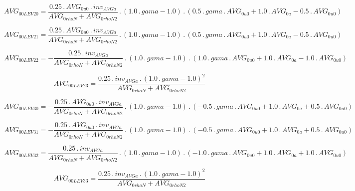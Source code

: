 \documentclass{article}
\begin{document}
\begin{dmath}AVG_{0 0 LEV 20} = \frac{0.25 \,.\, AVG_{0 u0} \,.\, inv_{AVG a}}{AVG_{0 rhoN} + AVG_{0 rhoN2}} \,.\, \left(1.0 \,.\, gama - 1.0\right) \,.\, \left(0.5 \,.\, gama \,.\, AVG_{0 u0} + 1.0 \,.\, AVG_{0 a} - 0.5 \,.\, AVG_{0 
u0}\right)\end{dmath}

\begin{dmath}AVG_{0 0 LEV 21} = \frac{0.25 \,.\, AVG_{0 u0} \,.\, inv_{AVG a}}{AVG_{0 rhoN} + AVG_{0 rhoN2}} \,.\, \left(1.0 \,.\, gama - 1.0\right) \,.\, \left(0.5 \,.\, gama \,.\, AVG_{0 u0} + 1.0 \,.\, AVG_{0 a} - 0.5 \,.\, AVG_{0 
u0}\right)\end{dmath}

\begin{dmath}AVG_{0 0 LEV 22} = - \frac{0.25 \,.\, inv_{AVG a}}{AVG_{0 rhoN} + AVG_{0 rhoN2}} \,.\, \left(1.0 \,.\, gama - 1.0\right) \,.\, \left(1.0 \,.\, gama \,.\, AVG_{0 u0} + 1.0 \,.\, AVG_{0 a} - 1.0 \,.\, AVG_{0 u0}\right)\end{dmath}

\begin{dmath}AVG_{0 0 LEV 23} = \frac{0.25 \,.\, inv_{AVG a} \,.\, \left(1.0 \,.\, gama - 1.0 \right)^{2}}{AVG_{0 rhoN} + AVG_{0 rhoN2}}\end{dmath}

\begin{dmath}AVG_{0 0 LEV 30} = - \frac{0.25 \,.\, AVG_{0 u0} \,.\, inv_{AVG a}}{AVG_{0 rhoN} + AVG_{0 rhoN2}} \,.\, \left(1.0 \,.\, gama - 1.0\right) \,.\, \left(- 0.5 \,.\, gama \,.\, AVG_{0 u0} + 1.0 \,.\, AVG_{0 a} + 0.5 \,.\, AVG_{0 
u0}\right)\end{dmath}

\begin{dmath}AVG_{0 0 LEV 31} = - \frac{0.25 \,.\, AVG_{0 u0} \,.\, inv_{AVG a}}{AVG_{0 rhoN} + AVG_{0 rhoN2}} \,.\, \left(1.0 \,.\, gama - 1.0\right) \,.\, \left(- 0.5 \,.\, gama \,.\, AVG_{0 u0} + 1.0 \,.\, AVG_{0 a} + 0.5 \,.\, AVG_{0 
u0}\right)\end{dmath}

\begin{dmath}AVG_{0 0 LEV 32} = \frac{0.25 \,.\, inv_{AVG a}}{AVG_{0 rhoN} + AVG_{0 rhoN2}} \,.\, \left(1.0 \,.\, gama - 1.0\right) \,.\, \left(- 1.0 \,.\, gama \,.\, AVG_{0 u0} + 1.0 \,.\, AVG_{0 a} + 1.0 \,.\, AVG_{0 u0}\right)\end{dmath}

\begin{dmath}AVG_{0 0 LEV 33} = \frac{0.25 \,.\, inv_{AVG a} \,.\, \left(1.0 \,.\, gama - 1.0 \right)^{2}}{AVG_{0 rhoN} + AVG_{0 rhoN2}}\end{dmath}
\end{document}
